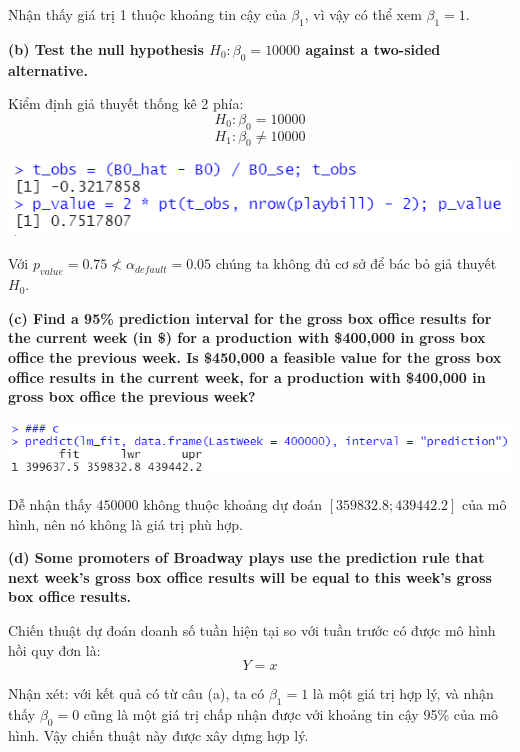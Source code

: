 \documentclass[a4paper]{article}
\theoremstyle{nonumberplain}
\begin{document}
Nhận thấy giá trị 1 thuộc khoảng tin cậy của $\beta_1$, vì vậy có thể xem $\beta_1 = 1$.

\textbf{(b) Test the null hypothesis $H_0: \beta_0 = 10000$ against a two-sided alternative.}

Kiểm định giả thuyết thống kê 2 phía:
$$H_0: \beta_0 = 10000$$
$$H_1: \beta_0 \neq 10000$$

\begin{center}
\includegraphics[scale = 0.8]{1b.PNG} 
\end{center}

Với $p_{value} = 0.75 \nless \alpha_{default}=0.05 $ chúng ta không đủ cơ sở để bác bỏ giả thuyết $H_0$.

\textbf{(c) Find a 95\% prediction interval for the gross box office results for the current week (in \$) for a production with \$400,000 in gross box office the previous week. Is \$450,000 a feasible value for the gross box office results in the current week, for a production with \$400,000 in gross box office the previous week?}

\begin{center}
\includegraphics[scale = 0.8]{1c.PNG} 
\end{center}

Dễ nhận thấy $450000$ không thuộc khoảng dự đoán $[359832.8; 439442.2]$ của mô hình, nên nó không là giá trị phù hợp.

\textbf{(d) Some promoters of Broadway plays use the prediction rule that next week’s gross box office results will be equal to this week’s gross box office results.}

Chiến thuật dự đoán doanh số tuần hiện tại so với tuần trước có được mô hình hồi quy đơn là: $$Y = x$$

Nhận xét: với kết quả có từ câu (a), ta có $\beta_1 = 1$ là một giá trị hợp lý, và nhận thấy $\beta_0 = 0$ cũng là một giá trị chấp nhận được với khoảng tin cậy 95\% của mô hình. Vậy chiến thuật này được xây dựng hợp lý.
\end{document}
